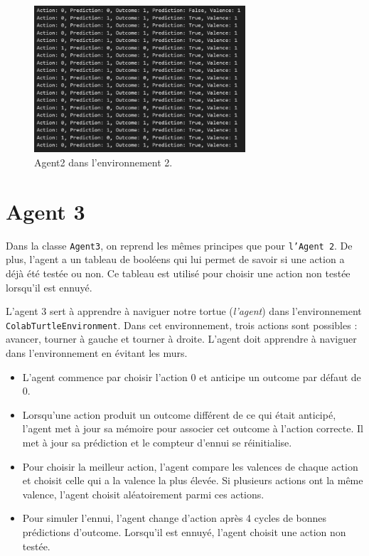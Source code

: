 \documentclass[a4paper, 12pt]{article}
\begin{document}
\begin{figure}[h]
    \centering
    \includegraphics[width=0.7\textwidth]{ReportImages/Agent2/Agent2_Env2.png}
    \caption{Agent2 dans l'environnement 2.}
\end{figure}

\vspace{-20pt}

\section{Agent 3}

\hspace*{\parindent} Dans la classe \texttt{Agent3}, on reprend les mêmes principes que pour \texttt{l'Agent 2}. De plus, l'agent a un tableau de booléens qui lui permet de savoir si une action a déjà été testée ou non. Ce tableau est utilisé pour choisir une action non testée lorsqu'il est ennuyé.

\vspace{10pt}

L'agent 3 sert à apprendre à naviguer notre tortue (\textit{l'agent}) dans l'environnement \texttt{ColabTurtleEnvironment}. Dans cet environnement, trois actions sont possibles : avancer, tourner à gauche et tourner à droite. L'agent doit apprendre à naviguer dans l'environnement en évitant les murs.

\newpage

\begin{itemize}
    \item L'agent commence par choisir l'action 0 et anticipe un outcome par défaut de 0.
    \item Lorsqu'une action produit un outcome différent de ce qui était anticipé, l'agent met à jour sa mémoire pour associer cet outcome à l'action correcte. Il met à jour sa prédiction et le compteur d'ennui se réinitialise.
    \item Pour choisir la meilleur action, l'agent compare les valences de chaque action et choisit celle qui a la valence la plus élevée. Si plusieurs actions ont la même valence, l'agent choisit aléatoirement parmi ces actions.
    \item Pour simuler l'ennui, l'agent change d'action après 4 cycles de bonnes prédictions d'outcome. Lorsqu'il est ennuyé, l'agent choisit une action non testée.
\end{itemize}
\end{document}
